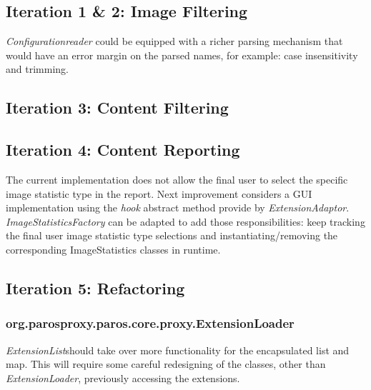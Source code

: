 \subsection{Iteration 1 \& 2: Image Filtering}
\textit{Configurationreader} could be equipped with a richer parsing mechanism that would have an error margin on the parsed names, for example: case insensitivity and trimming.
\subsection{Iteration 3: Content Filtering}
\subsection{Iteration 4: Content Reporting}
The current implementation does not allow the final user to select the specific image statistic type in the report. Next improvement considers a GUI implementation using the \textit{hook} abstract method provide by \textit{ExtensionAdaptor}. \textit{ImageStatisticsFactory} can be adapted to add those responsibilities: keep tracking the final user image statistic type selections and instantiating/removing the corresponding ImageStatistics classes in runtime.

\subsection{Iteration 5: Refactoring}
\subsubsection{org.parosproxy.paros.core.proxy.ExtensionLoader}
\textit{ExtensionList}should take over more functionality for the encapsulated list and map. This will require some careful redesigning of the classes, other than \textit{ExtensionLoader}, previously accessing the extensions.
